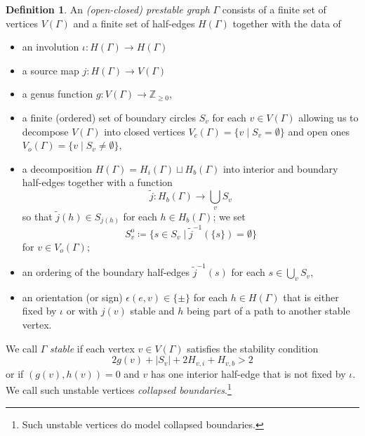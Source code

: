 \documentclass[11pt,psamsfonts, oneside, reqno]{amsart}
\newcommand{\union}[2]{\bigcup\limits_{#1}{#2}}%
\newcommand{\inv}{^{-1}}
\newcommand{\cl}{\colon}
\newcommand{\emst}{\emptyset}
\newcommand{\inn}{^\mathrm{o}}
\newcommand{\bZ}{\mathbb{Z}}
\newcommand{\wt}{\widetilde}
\theoremstyle{definition}
\newtheorem{definition}[theorem]{Definition}
\theoremstyle{remark}
\numberwithin{equation}{section}
\begin{document}
\begin{definition}\label{de:prestable-graph} An \emph{(open-closed) prestable graph} $\Gamma$ consists of a finite set of vertices $V(\Gamma)$ and a finite set of half-edges $H(\Gamma)$ together with the data of 
	\begin{itemize}[leftmargin=20pt]
		\setlength\itemsep{1.2pt}
		\item an involution $\iota\cl H(\Gamma)\to H(\Gamma)$
		\item a source map $j \cl H(\Gamma)\to V(\Gamma)$
		\item a genus function $g \cl V(\Gamma)\to \bZ_{\ge 0}$,
		\item a finite (ordered) set of boundary circles $S_v$ for each $v \in V(\Gamma)$ allowing us to decompose $V(\Gamma)$ into closed vertices $V_c(\Gamma) = \{v\mid S_v = \emst\}$ and open ones $V_o(\Gamma) = \{v \mid S_v \neq \emst\}$,
		\item a decomposition $H(\Gamma) = H_i(\Gamma) \sqcup H_b(\Gamma)$ into interior and boundary half-edges together with a function 
		\begin{equation}\label{}
			\wt j \cl H_b(\Gamma)\to \union{v}{S_v}
		\end{equation}
		so that $\wt j(h)\in S_{j(h)}$ for each $h \in H_b(\Gamma)$; we set 
		\[S_v\inn \coloneqq \{s\in S_v \mid \wt j\inv(\{s\}) = \emst\}\]
		for $v \in V_o(\Gamma)$;
		\item an ordering of the boundary half-edges $\wt j\inv(s)$ for each $s \in \union{v}{S_v}$,
		\item an orientation (or sign) $\epsilon(e,v)\in \{\pm\}$ for each $h \in H(\Gamma)$ that is either fixed by $\iota$ or with $j(v)$ stable and $h$ being part of a path to another stable vertex.
	\end{itemize}
	We call $\Gamma$ \emph{stable} if each vertex $v \in V(\Gamma)$ satisfies the stability condition 
	\begin{equation}\label{eq:stability-conditon} 2g(v) + |S_v| +2 H_{v,i} + H_{v,b} > 2\end{equation}
	or if $(g(v),h(v)) = 0$ and $v$ has one interior half-edge that is not fixed by $\iota$. We call such unstable vertices \emph{collapsed boundaries}.\footnote{Such unstable vertices do model collapsed boundaries.}
\end{definition}
\end{document}
